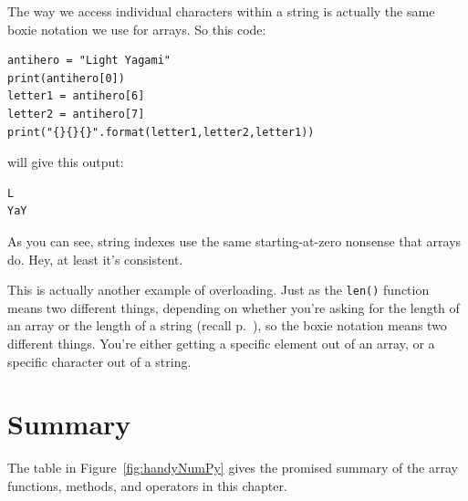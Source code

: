 
The way we access individual characters within a string is actually the same
boxie notation we use for arrays. So this code:

\vspace{-.15in}
\begin{Verbatim}[fontsize=\small,samepage=true,frame=single,framesep=3mm]
antihero = "Light Yagami"
print(antihero[0])
letter1 = antihero[6]
letter2 = antihero[7]
print("{}{}{}".format(letter1,letter2,letter1))
\end{Verbatim}
\vspace{-.1in}

will give this output:

\vspace{-.15in}
\begin{Verbatim}[fontsize=\small,samepage=true,frame=leftline,framesep=5mm,framerule=1mm]
L
YaY
\end{Verbatim}
\vspace{-.1in}


As you can see, string indexes use the same starting-at-zero nonsense that
arrays do. Hey, at least it's consistent.

\bigskip

This is actually another example of overloading. Just as the \texttt{len()}
function means two different things, depending on whether you're asking for the
length of an array or the length of a string (recall p.~\pageref{overloading}),
so the boxie notation means two different things. You're either getting a
specific element out of an array, or a specific character out of a string.

\section{Summary}

The table in Figure~\ref{fig:handyNumPy} gives the promised summary of
the array functions, methods, and operators in this chapter.

\setlength\extrarowheight{5pt}

